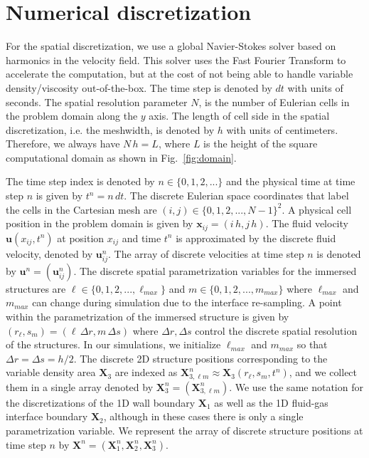 \documentclass[%
 aip,
 amsmath,amssymb,
 reprint,
 floatfix
]{revtex4-1}
\begin{document}
\section {Numerical discretization\label{sec:discretization}}

For the spatial discretization, we use a global Navier-Stokes solver based on harmonics in the velocity field. This solver uses the Fast Fourier Transform to accelerate the computation, but at the cost of not being able to handle variable density/viscosity out-of-the-box. The time step is denoted by $dt$ with units of seconds. The spatial resolution parameter $N$, is the number of Eulerian cells in the problem domain along the $y$ axis. The length of cell side in the spatial discretization, i.e. the meshwidth, is denoted by $h$ with units of centimeters. Therefore, we always have $N \, h = L$, where $L$ is the height of the square computational domain as shown in Fig.~\ref{fig:domain}. 

The time step index is denoted by $n \in \{0, 1, 2, ...\}$ and the physical time at time step $n$ is given by $t^n = n \, dt$. The discrete Eulerian space coordinates that label the cells in the Cartesian mesh are $(i, j) \in \{0, 1, 2, ..., N-1\}^2$. A physical cell position in the problem domain is given by ${\bm x}_{ij} = (i \, h, j \, h)$. The fluid velocity  $\boldsymbol{u}(x_{ij},t^n)$ at position $x_{ij}$ and time $t^n$ is approximated by the discrete fluid velocity, denoted by $\bm{u}_{ij}^n$. The array of discrete velocities at time step $n$ is denoted by ${\bm u}^n = (\bm{u}_{ij}^n)$. The discrete spatial parametrization variables for the immersed structures are $\ell \in \{0, 1, 2, ..., \ell_{max}\}$ and $m \in \{0, 1, 2, ..., m_{max}\}$ where $\ell_{max}$ and $m_{max}$ can change during simulation due to the interface re-sampling. A point within the parametrization of the immersed structure is given by $(r_\ell, s_m) = (\ell \, \Delta r, m \, \Delta s)$ where $\Delta r, \Delta s$ control the discrete spatial resolution of the structures. In our simulations, we initialize $\ell_{max}$ and $m_{max}$ so that $\Delta r = \Delta s = h / 2$. The discrete 2D structure positions corresponding to the variable density area $\bm{X}_3$ are indexed as  $\bm{X}_{3,\ell m}^n \approx \bm{X}_3(r_\ell,s_m,t^n)$, and we collect them in a single array denoted by $\bm{X}_3^n = (\bm{X}_{3,\ell m}^n)$. We use the same notation for the discretizations of the 1D wall boundary $\bm{X}_1$ as well as the 1D fluid-gas interface boundary $\bm{X}_2$, although in these cases there is only a single parametrization variable. We represent the array of discrete structure positions at time step $n$ by $\bm{X}^n = (\bm{X}_1^n,\bm{X}_2^n,\bm{X}_3^n)$.
\end{document}
